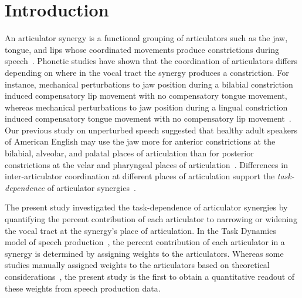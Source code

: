 \documentclass[preprint]{JASAnew}\usepackage[]{graphicx}\usepackage[]{color}
\begin{document}
\maketitle


\section{Introduction}

An articulator synergy is a functional grouping of articulators such as the jaw, tongue, and lips whose coordinated movements produce constrictions during speech~\cite{turvey1977preliminaries}. 
%
Phonetic studies have shown that the coordination of articulators differs depending on where in the vocal tract the synergy produces a constriction. 
%
For instance, mechanical perturbations to jaw position during a bilabial constriction induced compensatory lip movement with no compensatory tongue movement, 
%
whereas mechanical perturbations to jaw position during a lingual constriction induced compensatory tongue movement with no compensatory lip movement~\citep{kelso1984functionally}. 
%
Our previous study on unperturbed speech suggested that healthy adult speakers of American English may use the jaw more for anterior constrictions at the bilabial, alveolar, and palatal places of articulation than for posterior constrictions at the velar and pharyngeal places of articulation~\citep{Sorensen+2016}. 
%
Differences in inter-articulator coordination at different places of articulation support the \textit{task-dependence} of articulator synergies~\citep{latash2008synergy}. 

The present study investigated the task-dependence of articulator synergies by quantifying the percent contribution of each articulator to narrowing or widening the vocal tract at the synergy's place of articulation. 
%
In the Task Dynamics model of speech production~\citep{saltzman1989dynamical}, the percent contribution of each articulator in a synergy is determined by assigning weights to the articulators. 
%
Whereas some studies manually assigned weights to the articulators based on theoretical considerations~\citep[for example, see][for an assignment of weights based on articulator mass]{simko2010embodied}, the present study is the first to obtain a quantitative readout of these weights from speech production data. 
\end{document}
